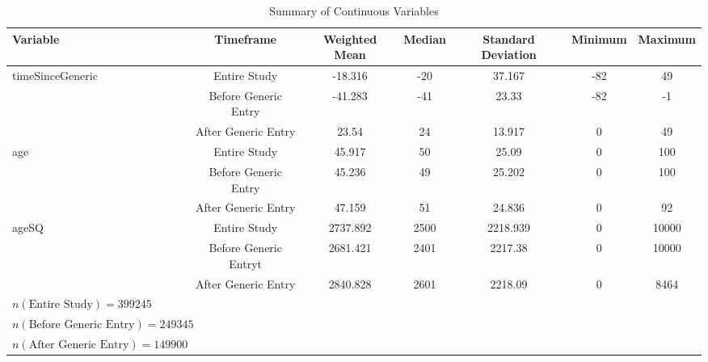 \begin{table}[htbp]\centering
\def\sym#1{\ifmmode^{#1}\else\(^{#1}\)\fi}
\caption{Summary of Continuous Variables\label{tab1}}
\begin{tabular}{l*{6}{c}}
\hline\hline
            Variable&\multicolumn{1}{c}{Timeframe}&\multicolumn{1}{c}{Weighted Mean}&\multicolumn{1}{c}{Median}&\multicolumn{1}{c}{Standard Deviation}&\multicolumn{1}{c}{Minimum}&\multicolumn{1}{c}{Maximum}\\
\hline
timeSinceGeneric    &     Entire Study&             -18.316&    -20&   37.167&     -82&  49\\
                    &     Before Generic Entry&     -41.283&    -41&    23.33 &     -82&  -1\\
                    &     After Generic Entry&       23.54 &    24&      13.917&     0&  49\\
[1em]
age                 &     Entire Study&             45.917&    50&    25.09 &     0&  100\\
                    &     Before Generic Entry&     45.236&    49&    25.202&     0&  100\\
                    &     After Generic Entry&      47.159&    51&    24.836&     0&  92\\
[1em]
ageSQ               &     Entire Study&             2737.892&    2500&  2218.939&     0&  10000\\
                    &     Before Generic Entryt&    2681.421&    2401&  2217.38 &     0&  10000\\
                    &     After Generic Entry&      2840.828&    2601&  2218.09 &     0&  8464\\
\hline
$n(\text{Entire Study}) = 399245$\\
$n(\text{Before Generic Entry}) = 249345$\\
$n(\text{After Generic Entry}) = 149900$\\
\hline\hline

\end{tabular}
\label{tab:Table4.2}
\end{table}
